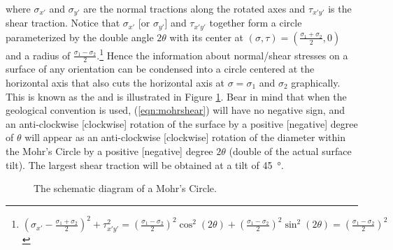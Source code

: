 where $\sigma_{x'}$ and $\sigma_{y'}$ are the normal tractions along the rotated axes and $\tau_{x'y'}$ is the shear traction. Notice that $\sigma_{x'}$ [or $\sigma_{y'}$] and $\tau_{x'y'}$ together form a circle parameterized by the double angle $2\theta$ with its center at $(\sigma, \tau) = (\frac{\sigma_1 + \sigma_2}{2}, 0)$ and a radius of $\frac{\sigma_1 - \sigma_2}{2}$.\footnote{$
(\sigma_{x'} - \frac{\sigma_1 + \sigma_2}{2})^2 + \tau_{x'y'}^2 = (\frac{\sigma_1 - \sigma_2}{2})^2\cos^2(2\theta) + (\frac{\sigma_1 - \sigma_2}{2})^2 \sin^2(2\theta) = (\frac{\sigma_1 - \sigma_2}{2})^2$}
Hence the information about normal/shear stresses on a surface of any orientation can be condensed into a circle centered at the horizontal axis that also cuts the horizontal axis at $\sigma = \sigma_1$ and $\sigma_2$ graphically. This is known as the  and is illustrated in Figure \ref{fig:mohr1}. Bear in mind that when the geological convention is used, (\ref{eqn:mohrshear}) will have no negative sign, and an anti-clockwise [clockwise] rotation of the surface by a positive [negative] degree of $\theta$ will appear as an anti-clockwise [clockwise] rotation of the diameter within the Mohr's Circle by a positive [negative] degree $2\theta$ (double of the actual surface tilt). The largest shear traction will be obtained at a tilt of \SI{45}{\degree}.
 
\begin{figure}
\centering
    \caption{The schematic diagram of a Mohr's Circle.}
    \label{fig:mohr1}
\end{figure}


